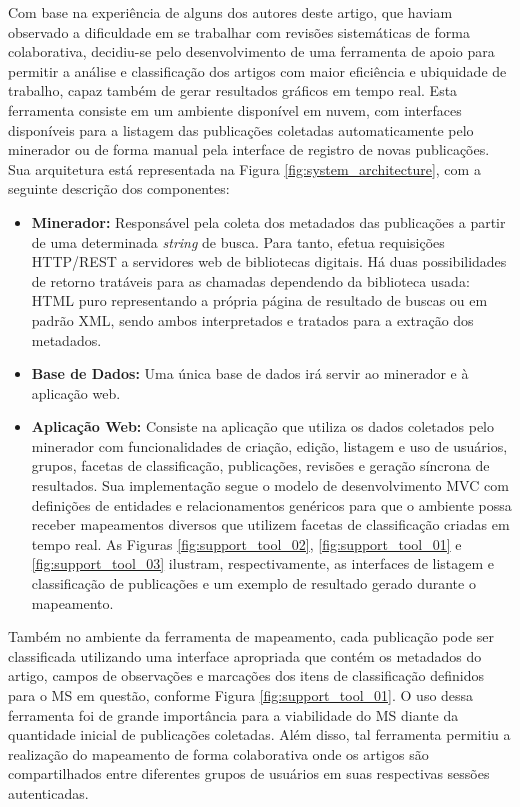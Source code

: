Com base na experi\^{e}ncia de alguns dos autores deste artigo, que haviam observado a dificuldade em se trabalhar com revis\~{o}es sistem\'{a}ticas de forma colaborativa, decidiu-se pelo desenvolvimento de uma ferramenta de apoio para permitir a an\'{a}lise e classifica\c c\~{a}o dos artigos com maior eficiência e ubiquidade de trabalho, capaz também de gerar resultados gr\'{a}ficos em tempo real. Esta ferramenta consiste em um ambiente disponível em nuvem, com interfaces disponíveis para a listagem das publicações coletadas automaticamente pelo minerador ou de forma manual pela interface de registro de novas publicações. Sua arquitetura está representada na Figura \ref{fig:system_architecture}, com a seguinte descrição dos componentes:

\begin{itemize}

\item \textbf{Minerador:} Responsável pela coleta dos metadados das publicações a partir de uma determinada \textit{string} de busca. Para tanto, efetua requisições HTTP/REST a servidores web de bibliotecas digitais. Há duas possibilidades de retorno tratáveis para as chamadas dependendo da biblioteca usada: HTML puro representando a própria página de resultado de buscas ou em padrão XML, sendo ambos interpretados e tratados para a extração dos metadados. 

\item \textbf{Base de Dados:} Uma única base de dados irá servir ao minerador e à aplicação web.

\item \textbf{Aplicação Web:} Consiste na aplicação que utiliza os dados coletados pelo minerador com funcionalidades de criação, edição, listagem e uso de usuários, grupos, facetas de classificação, publicações, revisões e geração síncrona de resultados. Sua implementação segue o modelo de desenvolvimento MVC com definições de entidades e relacionamentos genéricos para que o ambiente possa receber mapeamentos diversos que utilizem facetas de classificação criadas em tempo real. As Figuras \ref{fig:support_tool_02}, \ref{fig:support_tool_01} e \ref{fig:support_tool_03} ilustram, respectivamente, as interfaces de listagem e classificação de publicações e um exemplo de resultado gerado durante o mapeamento.

\end{itemize}

Também no ambiente da ferramenta de mapeamento, cada publicação pode ser classificada utilizando uma interface apropriada que contém os metadados do artigo, campos de observações e marcações dos itens de classificação definidos para o MS em questão, conforme Figura \ref{fig:support_tool_01}. O uso dessa ferramenta foi de grande importância para a viabilidade do MS diante da quantidade inicial de publicações coletadas. Al\'{e}m disso, tal ferramenta permitiu a realiza\c{c}\~{a}o do mapeamento de forma colaborativa onde os artigos s\~{a}o compartilhados entre diferentes grupos de usuários em suas respectivas sess\~{o}es autenticadas.

